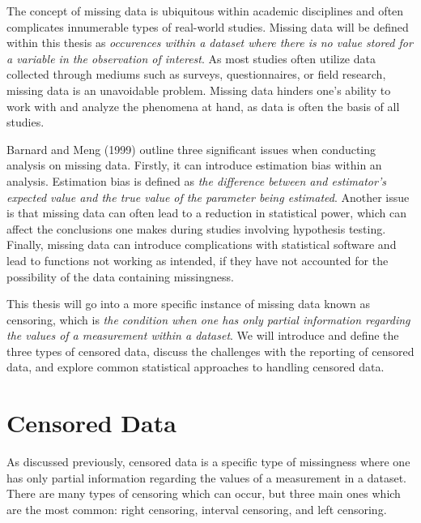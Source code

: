 \documentclass[12pt, twoside]{amherstthesis}
\begin{document}
The concept of missing data is ubiquitous within academic disciplines and often complicates innumerable types of real-world studies. Missing data will be defined within this thesis as \emph{occurences within a dataset where there is no value stored for a variable in the observation of interest}. As most studies often utilize data collected through mediums such as surveys, questionnaires, or field research, missing data is an unavoidable problem. Missing data hinders one's ability to work with and analyze the phenomena at hand, as data is often the basis of all studies.

Barnard and Meng (1999) outline three significant issues when conducting analysis on missing data. Firstly, it can introduce estimation bias within an analysis. Estimation bias is defined as \emph{the difference between and estimator's expected value and the true value of the parameter being estimated}. Another issue is that missing data can often lead to a reduction in statistical power, which can affect the conclusions one makes during studies involving hypothesis testing. Finally, missing data can introduce complications with statistical software and lead to functions not working as intended, if they have not accounted for the possibility of the data containing missingness.

This thesis will go into a more specific instance of missing data known as censoring, which is \emph{the condition when one has only partial information regarding the values of a measurement within a dataset}. We will introduce and define the three types of censored data, discuss the challenges with the reporting of censored data, and explore common statistical approaches to handling censored data.

\hypertarget{censored_data}{%
\section{Censored Data}\label{censored_data}}

As discussed previously, censored data is a specific type of missingness where one has only partial information regarding the values of a measurement in a dataset. There are many types of censoring which can occur, but three main ones which are the most common: right censoring, interval censoring, and left censoring.
\end{document}
